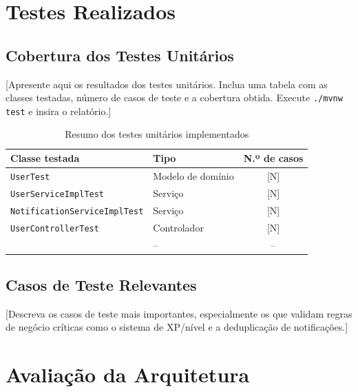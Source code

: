 \section{Testes Realizados}
\label{sec:testes}

\subsection{Cobertura dos Testes Unitários}
\label{subsec:cobertura-testes}

[Apresente aqui os resultados dos testes unitários. Inclua uma tabela com as
classes testadas, número de casos de teste e a cobertura obtida. Execute
\texttt{./mvnw test} e insira o relatório.]

\begin{table}[H]
  \centering
  \caption{Resumo dos testes unitários implementados}
  \label{qdr:testes}
  \begin{tabular}{llc}
    \toprule
    \textbf{Classe testada}          & \textbf{Tipo}      & \textbf{N.º de casos} \\
    \midrule
    \texttt{UserTest}                & Modelo de domínio  & [N]                   \\
    \texttt{UserServiceImplTest}     & Serviço            & [N]                   \\
    \texttt{NotificationServiceImplTest} & Serviço        & [N]                   \\
    \texttt{UserControllerTest}      & Controlador        & [N]                   \\
    [Demais classes\ldots]           & --                 & --                    \\
    \bottomrule
  \end{tabular}
\end{table}

\subsection{Casos de Teste Relevantes}
\label{subsec:casos-teste}

[Descreva os casos de teste mais importantes, especialmente os que validam
regras de negócio críticas como o sistema de XP/nível e a deduplicação de
notificações.]

\section{Avaliação da Arquitetura}
\label{sec:avaliacao-arquitetura}


